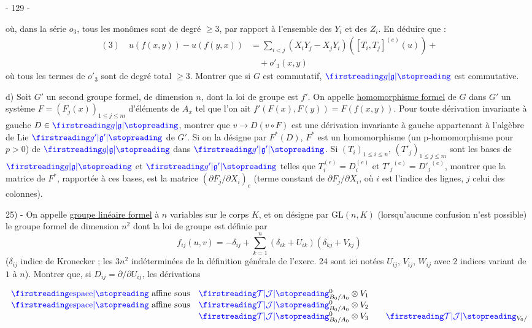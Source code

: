 \begin{center}- 129 -\end{center}

où, dans la série $o_3$, tous les monômes sont de degré $\geq3$, par rapport à l'ensemble des $Y_i$ et des $Z_i$. En déduire que :
\[
\begin{aligned}
(3)\quad u(f(x,y))-u(f(y,x))&=\sum_{i<j}(X_iY_j-X_jY_i)([T_i,T_j]^{(e)}(u))+\\
&\quad+o'_3(x,y)
\end{aligned}
\]
où tous les termes de $o'_3$ sont de degré total $\geq3$. Montrer que si $G$ est commutatif, $\unsure{g|\mathfrak g}$ est commutative.

d) Soit $G'$ un second groupe formel, de dimension $n$, dont la loi de groupe est $f'$. On appelle \uline{homomorphisme formel} de $G$ dans $G'$ un système $F=(F_j(x))_{1\leq j\leq m}$ d'éléments de $A_x$ tel que l'on ait $f'(F(x),F(y))=F(f(x,y))$. Pour toute dérivation invariante à gauche $D\in\unsure{g|\mathfrak g}$, montrer que $v\longrightarrow D(v\circ F)$ est une dérivation invariante à gauche appartenant à l'algèbre de Lie $\unsure{g'|\mathfrak g'}$ de $G'$. Si on la désigne par $F^*(D)$, $F^*$ est un homomorphisme (un p-homomorphisme pour $p>0$) de $\unsure{g|\mathfrak g}$ dans $\unsure{g'|\mathfrak g'}$. Si $(T_i)_{1\leq i\leq n}$, $(T'_j)_{1\leq j\leq m}$ sont les bases de $\unsure{g|\mathfrak g}$ et $\unsure{g'|\mathfrak g'}$ telles que $T_i^{(e)}=D_i^{(e)}$ et ${T'_j}^{(e)}={D'_j}^{(e)}$, montrer que la matrice de $F^*$, rapportée à ces bases, est la matrice $(\partial F_j/\partial X_i)_c$ (terme constant de $\partial F_j/\partial X_i$, où $i$ est l'indice des lignes, $j$ celui des colonnes).

25) - On appelle \uline{groupe linéaire formel} à $n$ variables sur le corps $K$, et on désigne par $\mathrm{GL}(n,K)$ (lorsqu'aucune confusion n'est possible) le groupe formel de dimension $n^2$ dont la loi de groupe est définie par
\[
f_{ij}(u,v)=-\delta_{ij}+\sum_{k=1}^n(\delta_{ik}+U_{ik})(\delta_{kj}+V_{kj})
\]
($\delta_{ij}$ indice de Kronecker ; les $3n^2$ indéterminées de la définition générale de l'exerc. 24 sont ici notées $U_{ij}$, $V_{ij}$, $W_{ij}$ avec $2$ indices variant de $1$ à $n$). Montrer que, si $D_{ij}=\partial/\partial U_{ij}$, les dérivations

\[
\begin{array}{ll}
\text{\unsure{espace} affine sous}&\unsure{\mathcal T|\mathcal J}^{0}_{B_0/A_0}\otimes V_1\\
\text{\unsure{espace} affine sous}&\unsure{\mathcal T|\mathcal J}^{0}_{B_0/A_0}\otimes V_2\\
&\unsure{\mathcal T|\mathcal J}^{0}_{B_0/A_0}\otimes V_3\qquad\unsure{\mathcal T|\mathcal J}_{V_0/}
\end{array}
\]


